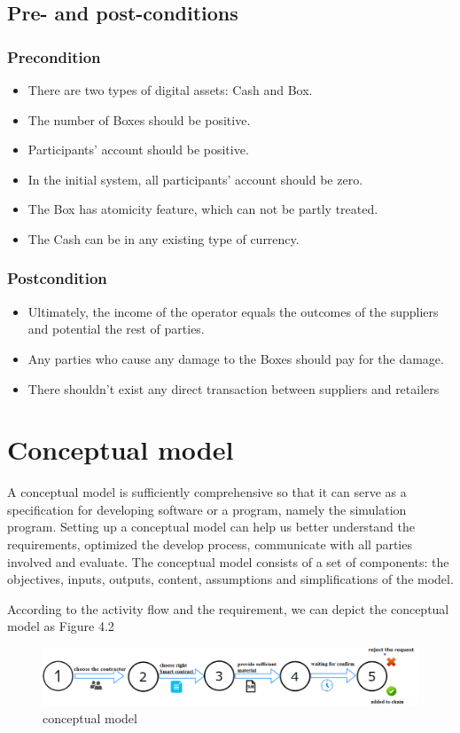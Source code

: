 \subsection{Pre- and post-conditions}
\subsubsection{Precondition}
\begin{itemize}
	\item There are two types of digital assets: Cash and Box.
	\item The number of Boxes should be positive.
	\item Participants' account should be positive.
	\item In the initial system, all participants' account should be zero.
	\item The Box has atomicity feature, which can not be partly treated.
	\item The Cash can be in any existing type of currency.
\end{itemize}
\subsubsection{Postcondition}
\begin{itemize}
	\item Ultimately, the income of the operator equals the outcomes of the suppliers and potential the rest of parties.
	\item Any parties who cause any damage to the Boxes should pay for the damage.
	\item There shouldn't exist any direct transaction between suppliers and retailers 
\end{itemize}

\section{Conceptual model}
A conceptual model is sufficiently comprehensive so that it can serve as a specification for developing software or a program, namely the simulation program. Setting up a conceptual model can help us
better understand the requirements, optimized the develop process, communicate with all parties involved and evaluate.
The conceptual model consists of a set of
components: the objectives, inputs, outputs, content, assumptions and simplifications of the model. 

According to the activity flow and the requirement, we can depict the conceptual model as Figure 4.2
\begin{figure}[!h]%
	\center
	\includegraphics[width=1.1\textwidth]{charts/steps}
	\caption{conceptual model}
	\label{fig:label}
\end{figure}

